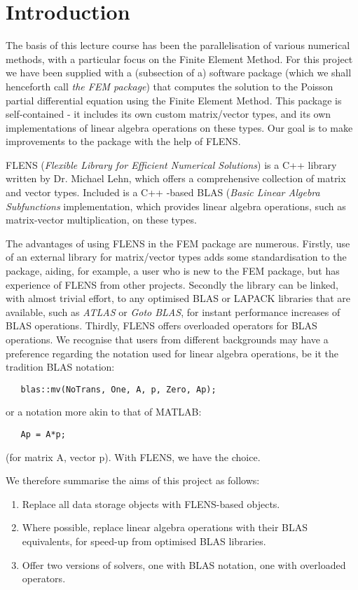 \setcounter{section}{-1}
\section{Introduction}

The basis of this lecture course has been the parallelisation of various numerical methods, with a particular focus on the Finite Element Method. For this project we have been supplied with a (subsection of a) software package (which we shall henceforth call \emph{the FEM package}) that computes the solution to the Poisson partial differential equation using the Finite Element Method. This package is self-contained - it includes its own custom matrix/vector types, and its own implementations of linear algebra operations on these types. Our goal is to make improvements to the package with the help of FLENS.

FLENS (\emph{Flexible Library for Efficient Numerical Solutions}) is a C++ library written by Dr. Michael Lehn, which offers a comprehensive collection of matrix and vector types. Included is a C++ -based BLAS (\emph{Basic Linear Algebra Subfunctions} implementation, which provides linear algebra operations, such as matrix-vector multiplication, on these types. 

The advantages of using FLENS in the FEM package are numerous. Firstly, use of an external library for matrix/vector types adds some standardisation to the package, aiding, for example, a user who is new to the FEM package, but has experience of FLENS from other projects. Secondly the library can be linked, with almost trivial effort, to any optimised BLAS or LAPACK libraries that are available, such as \emph{ATLAS} or \emph{Goto BLAS}, for instant performance increases of BLAS operations. Thirdly, FLENS offers overloaded operators for BLAS operations. We recognise that users from different backgrounds may have a preference regarding the notation used for linear algebra operations, be it the tradition BLAS notation:
\begin{lstlisting}
   blas::mv(NoTrans, One, A, p, Zero, Ap);
\end{lstlisting}
or a notation more akin to that of MATLAB:
\begin{lstlisting}
   Ap = A*p;
\end{lstlisting}
(for matrix A, vector p). With FLENS, we have the choice.

We therefore summarise the aims of this project as follows:
\begin{enumerate}
   \item Replace all data storage objects with FLENS-based objects.
   \item Where possible, replace linear algebra operations with their BLAS equivalents, for speed-up from optimised BLAS libraries.
   \item Offer two versions of solvers, one with BLAS notation, one with overloaded operators.
\end{enumerate}


